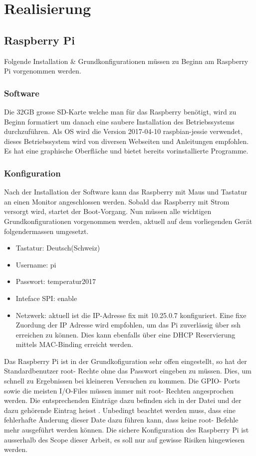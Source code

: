 \section{Realisierung}

\subsection{Raspberry Pi}

Folgende Installation \& Grundkonfigurationen müssen zu Beginn am Raspberry Pi vorgenommen werden.

\subsubsection{Software}
Die 32GB grosse SD-Karte welche man für das Raspberry benötigt, wird zu Beginn formatiert um danach eine saubere Installation des Betriebssystems durchzuführen. Als OS wird die Version 2017-04-10 raspbian-jessie verwendet, dieses Betriebssystem wird von diversen Webseiten und Anleitungen empfohlen. Es hat eine graphische Oberfläche und bietet bereits vorinstallierte Programme.

\subsubsection{Konfiguration}
Nach der Installation der Software kann das Raspberry mit Maus und Tastatur an einen Monitor angeschlossen werden. Sobald das Raspberry mit Strom versorgt wird, startet der Boot-Vorgang.
Nun müssen alle wichtigen Grundkonfigurationen vorgenommen werden, aktuell auf dem vorliegenden Gerät folgendermassen umgesetzt.
\begin{itemize}
	\item Tastatur: Deutsch(Schweiz)
	\item Username: pi
	\item Passwort: temperatur2017
	\item Inteface SPI: enable
	\item Netzwerk: aktuell ist die IP-Adresse fix mit 10.25.0.7 konfiguriert. Eine fixe Zuordung der IP Adresse wird empfohlen, um das Pi zuverlässig über ssh erreichen zu können. Dies kann ebenfalls über eine DHCP Reservierung mittels MAC-Binding erreicht werden.
\end{itemize}
Das Raspberry Pi ist in der Grundkofiguration sehr offen eingestellt, so hat der Standardbenutzer root- Rechte ohne das Passwort eingeben zu müssen. Dies, um schnell zu Ergebnissen bei kleineren Versuchen zu kommen. Die GPIO- Ports sowie die meisten I/O-Files müssen immer mit root- Rechten angesprochen werden. Die entsprechenden Einträge dazu befinden sich in der Datei  und der dazu gehörende Eintrag heisst . Unbedingt beachtet werden muss, dass eine fehlerhafte Änderung dieser Date dazu führen kann, dass keine root- Befehle mehr ausgeführt werden können. Die sichere Konfiguration des Raspberry Pi ist ausserhalb des Scope dieser Arbeit, es soll nur auf gewisse Risiken hingewiesen werden.

